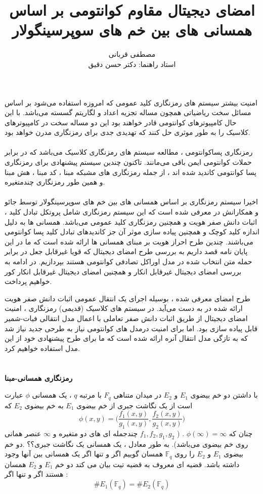 \documentclass[12pt,a4paper]{article}
\title{امضای دیجیتال مقاوم کوانتومی بر اساس همسانی های بین خم های سوپرسینگولار}
\author{مصطفی قربانی
	\\[1cm]{ استاد راهنما: دکتر حسن دقیق}}
\date{}
\begin{document}
	\maketitle
	
امنیت بیشتر سیستم های رمزنگاری کلید عمومی که امروزه استفاده می‌شود بر اساس مسائل سخت ریاضیاتی همچون مساله تجزیه اعداد و لگاریتم گسسته می‌باشد. با این حال کامپیوترهای کوانتومی قادر خواهند بود این دو مساله سخت در کامپیوترهای کلاسیک را به طور موثری حل کنند که تهدیدی جدی برای رمزنگاری مدرن خواهد بود.
\\
\\
رمزنگاری پساکوانتومی ، مطالعه سیستم های رمزنگاری کلاسیک  می‌باشد که در برابر حملات کوانتومی ایمن باقی می‌مانند.
تاکنون چندین سیستم پیشنهادی برای رمزنگاری پسا کوانتومی کاندید شده اند ، از جمله رمزنگاری های مشبکه مبنا ، کد مبنا ، هش مبنا و همین طور رمزنگاری چندمتغیره.
\\
\\
اخیرا سیستم رمزنگاری بر اساس همسانی های بین خم های سوپرسینگولار توسط جائو و همکارانش در
\cite{jao2014towards}
معرفی شده است که این سیستم رمزنگاری شامل پروتکل تبادل کلید ، اثبات دانش صفر هویت و همچنین رمزنگاری کلید عمومی می‌باشد. همسانی ها به دلیل اندازه کلید کوچک و همچنین پیاده سازی موثر آن 
\cite{efficient, jalali2017efficient}
جز کاندیدهای تبادل کلید پسا کوانتومی می‌باشند.
چندین طرح احراز هویت بر مبنای همسانی ها ارائه شده است که ما در این پایان نامه قصد داریم به بررسی  طرح امضای دیجیتال که قویا غیرقابل جعل در برابر حمله متن انتخاب شده
 در مدل اوراکل تصادفی کوانتومی هستند 
 \cite{base}
 بپردازیم. در ادامه به بررسی امضای دیجیتال غیرقابل انکار 
 \cite{undeniable}
 و همچنین امضای دیجیتال غیرقابل انکار کور 
 \cite{blind}
 خواهیم پرداخت. 
 
 طرح امضای معرفی شده ، بوسیله اجرای یک انتقال عمومی اثبات دانش صفر هویت ارائه شده در 
\cite{jao2014towards}
به دست می‌آید. در سیستم های کلاسیک (قدیمی) رمزنگاری ، امنیت امضای دیجیتال از طریق اثبات دانش صفر تعاملی
با اعمال مدل انتقالی فیات-شمیر
 قابل پیاده سازی بود. اما برای امنیت درمدل های کوانتومی نیاز به طرحی جدید نیاز شد که به تازگی
 مدل انتقال آنره
 ارائه شده است که ما برای طرح پیشنهادی خود از این مدل استفاده خواهیم کرد.
 \\
 \\
 \\
 \textbf{رمزنگاری همسانی-مبنا}

با داشتن دو خم بیضوی 
$ E_1 $
و
$ E_2 $
در میدان متناهی 
$F_q $
با مرتبه 
$q$
، یک همسانی 
$\phi$
عبارت است از یک نگاشت جبری از خم بیضوی
$E_1$
به خم بیضوی
$E_2$
 که 
 $$ \phi(x,y) = \Big(\frac{f_1(x,y)}{g_1(x,y)} , \frac{f_2(x,y)}{g_2(x,y)}\Big) $$
 چنان که 
 $\phi(\infty) = \infty$
. (
$f_1,f_2,g_1,g_2$
چندجمله ای های دو متغیره و 
$\infty$
عنصر همانی روی خم بیضوی می‌باشد). به طور معادل ، یک همسانی یک نگاشت جبری؟؟
.دو خم بیضوی 
$E_1$
و
$E_2$
را روی 
$\mathbb{F}_q$
همسان گوییم اگر و تنها اگر یک همسانی بین آنها وجود داشته باشد. قضیه ای معروف به قضیه تیت 
بیان می کند دو خم 
$E_1$
و
$E_2$
همسان هستند اگر و تنها اگر : 
$$ \# E_1(\mathbb{F}_q) =  \# E_2(\mathbb{F}_q)$$
\end{document}
